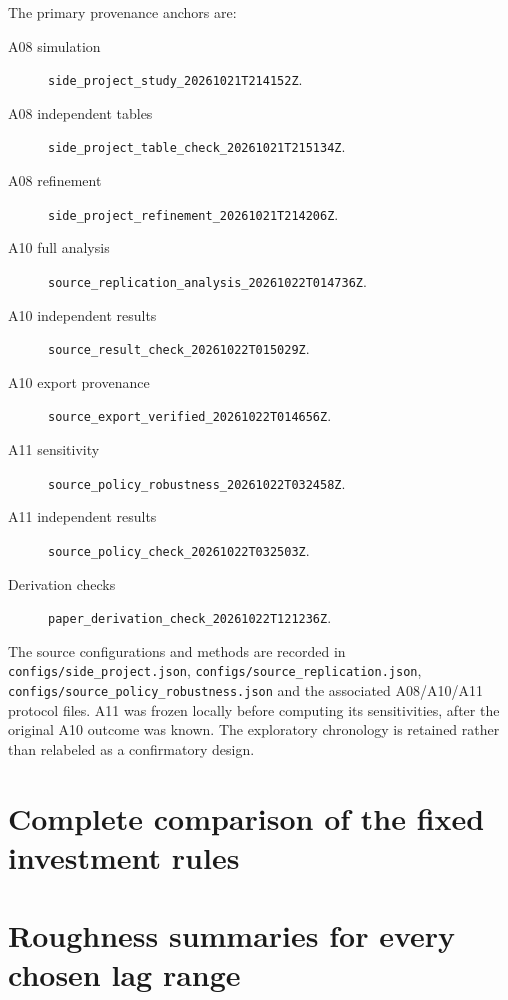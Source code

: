 \documentclass[11pt,a4paper]{article}
\newcommand{\RunID}[1]{\nolinkurl{#1}}
\begin{document}
The primary provenance anchors are:
\begin{description}
\item[A08 simulation] \RunID{side_project_study_20261021T214152Z}.
\item[A08 independent tables] \RunID{side_project_table_check_20261021T215134Z}.
\item[A08 refinement] \RunID{side_project_refinement_20261021T214206Z}.
\item[A10 full analysis] \RunID{source_replication_analysis_20261022T014736Z}.
\item[A10 independent results] \RunID{source_result_check_20261022T015029Z}.
\item[A10 export provenance] \RunID{source_export_verified_20261022T014656Z}.
\item[A11 sensitivity] \RunID{source_policy_robustness_20261022T032458Z}.
\item[A11 independent results] \RunID{source_policy_check_20261022T032503Z}.
\item[Derivation checks] \RunID{paper_derivation_check_20261022T121236Z}.
\end{description}
The source configurations and methods are recorded in \texttt{configs/side\_project.json}, \texttt{configs/source\_replication.json}, \texttt{configs/source\_policy\_robustness.json} and the associated A08/A10/A11 protocol files. A11 was frozen locally before computing its sensitivities, after the original A10 outcome was known. The exploratory chronology is retained rather than relabeled as a confirmatory design.

\clearpage
\section{Complete comparison of the fixed investment rules}\label{app:policies}
\begin{table}[htbp]\centering\small\setlength{\tabcolsep}{7pt}
\caption{Complete A11 policy matrix. Targets/caps are percentages; gaps are mean absolute weight differences in pp; ``large'' counts origins with an absolute gap of at least 5pp. All rows use the same  dependent origins.}
\end{table}

\clearpage
\section{Roughness summaries for every chosen lag range}\label{app:bands}
\begin{table}[htbp]\centering\small\setlength{\tabcolsep}{10pt}
\caption{Full-window finite-band H-tilde at every grid and fixed band. Both explicit discovery dates remain included. These values are descriptive and do not carry latent-H confidence intervals.}
\end{table}
\end{document}
